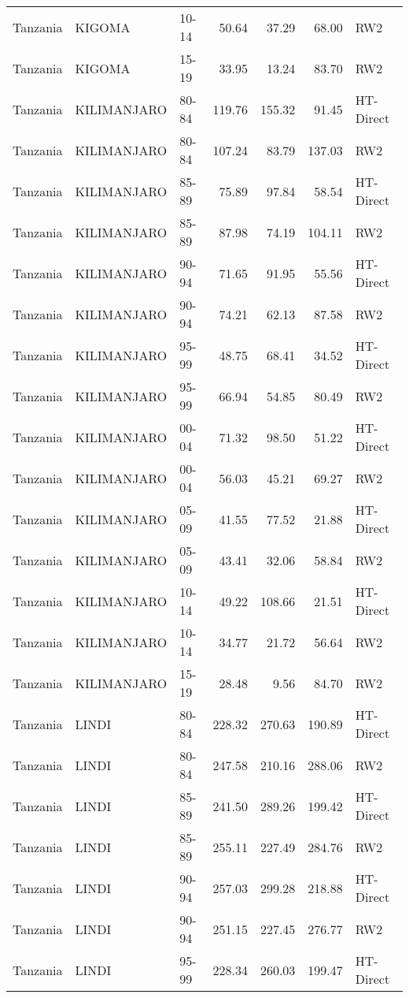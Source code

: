 \begin{longtable}{lllrrrl}
  Tanzania & KIGOMA & 10-14 & 50.64 & 37.29 & 68.00 & RW2 \\ 
  Tanzania & KIGOMA & 15-19 & 33.95 & 13.24 & 83.70 & RW2 \\ 
  Tanzania & KILIMANJARO & 80-84 & 119.76 & 155.32 & 91.45 & HT-Direct \\ 
  Tanzania & KILIMANJARO & 80-84 & 107.24 & 83.79 & 137.03 & RW2 \\ 
  Tanzania & KILIMANJARO & 85-89 & 75.89 & 97.84 & 58.54 & HT-Direct \\ 
  Tanzania & KILIMANJARO & 85-89 & 87.98 & 74.19 & 104.11 & RW2 \\ 
  Tanzania & KILIMANJARO & 90-94 & 71.65 & 91.95 & 55.56 & HT-Direct \\ 
  Tanzania & KILIMANJARO & 90-94 & 74.21 & 62.13 & 87.58 & RW2 \\ 
  Tanzania & KILIMANJARO & 95-99 & 48.75 & 68.41 & 34.52 & HT-Direct \\ 
  Tanzania & KILIMANJARO & 95-99 & 66.94 & 54.85 & 80.49 & RW2 \\ 
  Tanzania & KILIMANJARO & 00-04 & 71.32 & 98.50 & 51.22 & HT-Direct \\ 
  Tanzania & KILIMANJARO & 00-04 & 56.03 & 45.21 & 69.27 & RW2 \\ 
  Tanzania & KILIMANJARO & 05-09 & 41.55 & 77.52 & 21.88 & HT-Direct \\ 
  Tanzania & KILIMANJARO & 05-09 & 43.41 & 32.06 & 58.84 & RW2 \\ 
  Tanzania & KILIMANJARO & 10-14 & 49.22 & 108.66 & 21.51 & HT-Direct \\ 
  Tanzania & KILIMANJARO & 10-14 & 34.77 & 21.72 & 56.64 & RW2 \\ 
  Tanzania & KILIMANJARO & 15-19 & 28.48 & 9.56 & 84.70 & RW2 \\ 
  Tanzania & LINDI & 80-84 & 228.32 & 270.63 & 190.89 & HT-Direct \\ 
  Tanzania & LINDI & 80-84 & 247.58 & 210.16 & 288.06 & RW2 \\ 
  Tanzania & LINDI & 85-89 & 241.50 & 289.26 & 199.42 & HT-Direct \\ 
  Tanzania & LINDI & 85-89 & 255.11 & 227.49 & 284.76 & RW2 \\ 
  Tanzania & LINDI & 90-94 & 257.03 & 299.28 & 218.88 & HT-Direct \\ 
  Tanzania & LINDI & 90-94 & 251.15 & 227.45 & 276.77 & RW2 \\ 
  Tanzania & LINDI & 95-99 & 228.34 & 260.03 & 199.47 & HT-Direct \\ 

\end{longtable}
